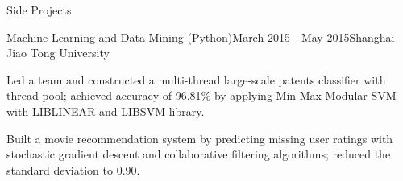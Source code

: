 \documentclass{resume} %
\begin{document}
\begin{rSection}{Side Projects}
\begin{rSubsection}{Machine Learning and Data Mining (Python)}{March 2015 - May 2015}{}{Shanghai Jiao Tong University}
\item Led a team and constructed a multi-thread large-scale patents classifier with thread pool; achieved accuracy of 96.81\% by applying Min-Max Modular SVM with LIBLINEAR and LIBSVM library.
\item Built a movie recommendation system by predicting missing user ratings with stochastic gradient descent and collaborative filtering algorithms; reduced the standard deviation to 0.90.
\end{rSubsection}


\end{rSection}



\end{document}

